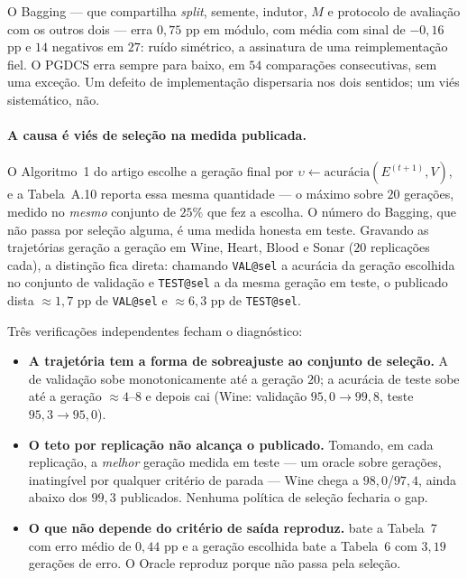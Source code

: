 O Bagging --- que compartilha \emph{split}, semente, indutor, $M$ e protocolo de
avaliação com os outros dois --- erra $0{,}75$ pp em módulo, com média com sinal de
$-0{,}16$ pp e $14$ negativos em $27$: ruído simétrico, a assinatura de uma
reimplementação fiel. O PGDCS erra sempre para baixo, em $54$ comparações
consecutivas, sem uma exceção. Um defeito de implementação dispersaria nos dois
sentidos; um viés sistemático, não.

\paragraph{A causa é viés de seleção na medida publicada.} O Algoritmo~1 do artigo
escolhe a geração final por $\upsilon \leftarrow \text{acurácia}(E^{(t+1)}, V)$, e a
Tabela~A.10 reporta essa mesma quantidade --- o máximo sobre $20$ gerações, medido
no \emph{mesmo} conjunto de $25\%$ que fez a escolha. O número do Bagging, que não
passa por seleção alguma, é uma medida honesta em teste. Gravando as trajetórias
geração a geração em Wine, Heart, Blood e Sonar ($20$ replicações cada), a
distinção fica direta: chamando \texttt{VAL@sel} a acurácia da geração escolhida no
conjunto de validação e \texttt{TEST@sel} a da mesma geração em teste, o publicado
dista $\approx1{,}7$ pp de \texttt{VAL@sel} e $\approx6{,}3$ pp de
\texttt{TEST@sel}.

Três verificações independentes fecham o diagnóstico:

\begin{itemize}
\item \textbf{A trajetória tem a forma de sobreajuste ao conjunto de seleção.} A
\mvr{} de validação sobe monotonicamente até a geração $20$; a acurácia de teste
sobe até a geração $\approx4$--$8$ e depois cai (Wine: validação $95{,}0 \to
99{,}8$, teste $95{,}3 \to 95{,}0$).

\item \textbf{O teto por replicação não alcança o publicado.} Tomando, em cada
replicação, a \emph{melhor} geração medida em teste --- um oracle sobre gerações,
inatingível por qualquer critério de parada --- Wine chega a $98{,}0$/$97{,}4$,
ainda abaixo dos $99{,}3$ publicados. Nenhuma política de seleção fecharia o gap.

\item \textbf{O que não depende do critério de saída reproduz.}  bate a
Tabela~7 com erro médio de $0{,}44$ pp e a geração escolhida bate a Tabela~6 com
$3{,}19$ gerações de erro. O Oracle reproduz porque não passa pela seleção.
\end{itemize}

